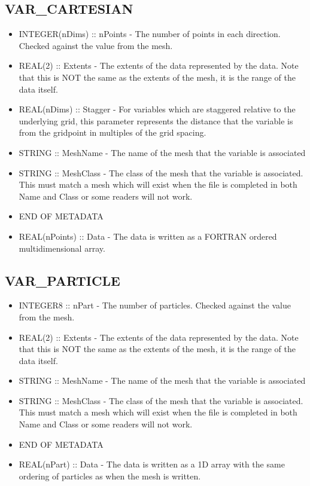 \documentclass[8pt]{article}
\begin{document}
\subsection{VAR\_CARTESIAN}
\begin{itemize}
\item  INTEGER(nDims) :: nPoints - The number of points in each direction. Checked against the value from the mesh.
\item  REAL(2)  :: Extents - The extents of the data represented by the data. Note that this is NOT the same as the extents of the mesh, it is the range of the data itself.
\item  REAL(nDims) :: Stagger - For variables which are staggered relative to the underlying grid, this parameter represents the distance that the variable is from the gridpoint in multiples of the grid spacing.
\item STRING :: MeshName - The name of the mesh that the variable is associated
\item STRING :: MeshClass - The class of the mesh that the variable is associated. This must match a mesh which will exist when the file is completed in both Name and Class or some readers will not work.
\item END OF METADATA
\item REAL(nPoints) :: Data - The data is written as a FORTRAN ordered multidimensional array.
\end{itemize}
\subsection{VAR\_PARTICLE}
\begin{itemize}
\item  INTEGER8 :: nPart - The number of particles. Checked against the value from the mesh.
\item  REAL(2)  :: Extents - The extents of the data represented by the data. Note that this is NOT the same as the extents of the mesh, it is the range of the data itself.
\item STRING :: MeshName - The name of the mesh that the variable is associated
\item STRING :: MeshClass - The class of the mesh that the variable is associated. This must match a mesh which will exist when the file is completed in both Name and Class or some readers will not work.
\item END OF METADATA
\item REAL(nPart) :: Data - The data is written as a 1D array with the same ordering of particles as when the mesh is written.
\end{itemize}
\end{document}
